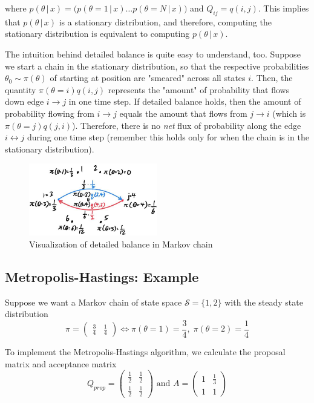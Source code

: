   where $p(\theta\,|\,x) = \big( p(\theta=1\,|\,x) \ldots p(\theta=N\,|\,x)\big)$ and $Q_{ij} = q(i, j)$. This implies that $p(\theta\,|\,x)$ is a stationary distribution, and therefore, computing the stationary distribution is equivalent to computing $p(\theta\,|\,x)$.

  The intuition behind detailed balance is quite easy to understand, too. Suppose we start a chain in the stationary distribution, so that the respective probabilities $\theta_0 \sim \pi(\theta)$ of starting at position are "smeared" across all states $i$. Then, the quantity $\pi(\theta = i) q (i, j)$ represents the "amount" of probability that flows down edge $i \rightarrow j$ in one time step. If detailed balance holds, then the amount of probability flowing from $i \rightarrow j$ equals the amount that flows from $j \rightarrow i$ (which is $\pi(\theta = j) q(j, i)$). Therefore, there is no \textit{net} flux of probability along the edge $i \leftrightarrow j$ during one time step (remember this holds only for when the chain is in the stationary distribution).

  \begin{figure}[H]
    \centering
    \includegraphics[width=0.5\textwidth]{img/Detailed_Balance.jpg}
    \caption{Visualization of detailed balance in Markov chain}
  \end{figure}

\subsection{Metropolis-Hastings: Example}

  Suppose we want a Markov chain of state space $\mathcal{S} = \{1, 2\}$ with the steady state distribution
  \begin{equation}
    \pi = \begin{pmatrix} \frac{3}{4} & \frac{1}{4} \end{pmatrix} \iff \pi(\theta = 1) = \frac{3}{4}, \; \pi(\theta = 2) = \frac{1}{4}
  \end{equation}

  To implement the Metropolis-Hastings algorithm, we calculate the proposal matrix and acceptance matrix
  \begin{equation}
    Q_{prop} = \begin{pmatrix} \frac{1}{2} & \frac{1}{2} \\ \frac{1}{2} & \frac{1}{2} \end{pmatrix} \text{ and } 
    A = \begin{pmatrix} 1 & \frac{1}{3} \\ 1 & 1 \end{pmatrix}
  \end{equation}

